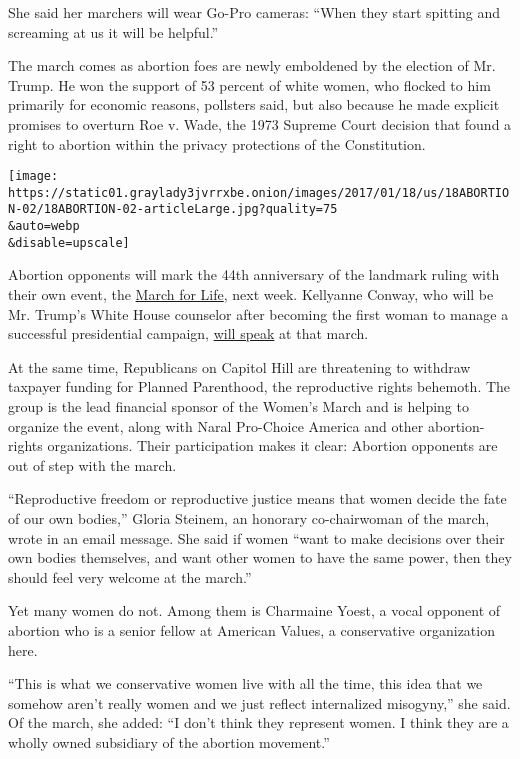 She said her marchers will wear Go-Pro cameras: ``When they start
spitting and screaming at us it will be helpful.''

The march comes as abortion foes are newly emboldened by the election of
Mr. Trump. He won the support of 53 percent of white women, who flocked
to him primarily for economic reasons, pollsters said, but also because
he made explicit promises to overturn Roe v. Wade, the 1973 Supreme
Court decision that found a right to abortion within the privacy
protections of the Constitution.

\texttt{[image: https://static01.graylady3jvrrxbe.onion/images/2017/01/18/us/18ABORTION-02/18ABORTION-02-articleLarge.jpg?quality=75\\\&auto=webp\\\&disable=upscale]}

Abortion opponents will mark the 44th anniversary of the landmark ruling
with their own event, the \href{http://marchforlife.org/}{March for
Life}, next week. Kellyanne Conway, who will be Mr. Trump's White House
counselor after becoming the first woman to manage a successful
presidential campaign,
\href{https://www.nytimes3xbfgragh.onion/2017/01/11/us/kellyanne-conway-anti-abortion-march.html}{will
speak} at that march.

At the same time, Republicans on Capitol Hill are threatening to
withdraw taxpayer funding for Planned Parenthood, the reproductive
rights behemoth. The group is the lead financial sponsor of the Women's
March and is helping to organize the event, along with Naral Pro-Choice
America and other abortion-rights organizations. Their participation
makes it clear: Abortion opponents are out of step with the march.

``Reproductive freedom or reproductive justice means that women decide
the fate of our own bodies,'' Gloria Steinem, an honorary co-chairwoman
of the march, wrote in an email message. She said if women ``want to
make decisions over their own bodies themselves, and want other women to
have the same power, then they should feel very welcome at the march.''

Yet many women do not. Among them is Charmaine Yoest, a vocal opponent
of abortion who is a senior fellow at American Values, a conservative
organization here.

``This is what we conservative women live with all the time, this idea
that we somehow aren't really women and we just reflect internalized
misogyny,'' she said. Of the march, she added: ``I don't think they
represent women. I think they are a wholly owned subsidiary of the
abortion movement.''

